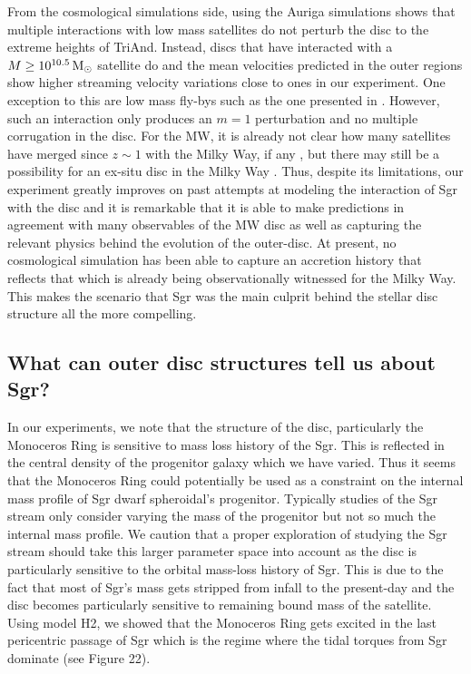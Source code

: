 \documentclass[useAMS,usenatbib]{mnras}
\begin{document}
{From the cosmological simulations side, using the Auriga simulations \cite{gomez16} shows that multiple interactions with low mass satellites do not perturb the disc to the extreme heights of TriAnd. Instead, discs that have interacted with a $M\geq10^{10.5}\,\rm{M_{\odot}}$ satellite do and the mean velocities predicted in the outer regions show higher streaming velocity variations close to ones in our experiment. One exception to this are low mass fly-bys such as the one presented in \citep{gomez15b}. However, such an interaction only produces an $m=1$ perturbation and no multiple corrugation in the disc. For the MW, it is already not clear how many satellites have merged since $z\sim1$ with the Milky Way, if any \citep{ruchti15}, but there may still be a possibility for an ex-situ disc in the Milky Way \citep{gomez17}. Thus, despite its limitations, our experiment greatly improves on past attempts at modeling the interaction of Sgr with the disc and it is remarkable that it is able to make predictions in agreement with many observables of the MW disc as well as capturing the relevant physics behind the evolution of the outer-disc. At present, no cosmological simulation has been able to capture an accretion history that reflects that which is already being observationally witnessed for the Milky Way. This makes the scenario that Sgr was the main culprit behind the stellar disc structure all the more compelling. %

\subsection{What can outer disc structures tell us about Sgr?}

In our experiments, we note that the structure of the disc, particularly the Monoceros Ring is sensitive to mass loss history of the Sgr. This is reflected in the central density of the progenitor galaxy which we have varied. Thus it seems that the Monoceros Ring could potentially be used as a constraint on the internal mass profile of Sgr dwarf spheroidal's progenitor. Typically studies of the Sgr stream only consider varying the mass of the progenitor \citep{penarrubia10,law10,gibbons16} but not so much the internal mass profile. We caution that a proper exploration of studying the Sgr stream should take this larger parameter space into account as the disc is particularly sensitive to the orbital mass-loss history of Sgr. This is due to the fact that most of Sgr's mass gets stripped from infall to the present-day and the disc becomes particularly sensitive to remaining bound mass of the satellite. Using model H2, we showed that the Monoceros Ring gets excited in the last pericentric passage of Sgr which is the regime where the tidal torques from Sgr dominate (see Figure 22).  

}
\end{document}
